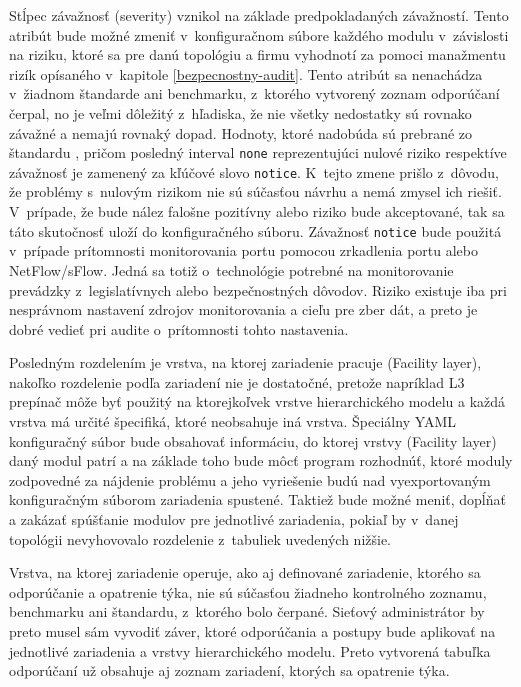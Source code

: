 Stĺpec závažnosť (severity) vznikol na základe predpokladaných závažností. Tento atribút bude možné zmeniť v~konfiguračnom súbore každého modulu v~závislosti na riziku, ktoré sa pre danú topológiu a firmu vyhodnotí za pomoci manažmentu rizík opísaného v~kapitole \ref{bezpecnostny-audit}. Tento atribút sa nenachádza v~žiadnom štandarde ani benchmarku, z~ktorého vytvorený zoznam odporúčaní čerpal, no je veľmi dôležitý z~hľadiska, že nie všetky nedostatky sú rovnako závažné a nemajú rovnaký dopad. Hodnoty, ktoré nadobúda sú prebrané zo štandardu , pričom posledný interval \texttt{none} reprezentujúci nulové riziko respektíve závažnosť je zamenený za kľúčové slovo \texttt{notice}. K~tejto zmene prišlo z~dôvodu, že problémy s~nulovým rizikom nie sú súčasťou návrhu a nemá zmysel ich riešiť. V~prípade, že bude nález falošne pozitívny alebo riziko bude akceptované, tak sa táto skutočnosť uloží do konfiguračného súboru. Závažnosť \texttt{notice} bude použitá v~prípade prítomnosti monitorovania portu pomocou zrkadlenia portu alebo NetFlow/sFlow. Jedná sa totiž o~technológie potrebné na monitorovanie prevádzky z~legislatívnych alebo bezpečnostných dôvodov. Riziko existuje iba pri nesprávnom nastavení zdrojov monitorovania a cieľu pre zber dát, a preto je dobré vedieť pri audite o~prítomnosti tohto nastavenia.
 

Posledným rozdelením je vrstva, na ktorej zariadenie pracuje (Facility layer), nakoľko rozdelenie podľa zariadení nie je dostatočné, pretože napríklad L3 prepínač môže byť použitý na ktorejkoľvek vrstve hierarchického modelu a každá vrstva má určité špecifiká, ktoré neobsahuje iná vrstva. Špeciálny YAML konfiguračný súbor bude obsahovať informáciu, do ktorej vrstvy (Facility layer) daný modul patrí a na základe toho bude môcť program rozhodnúť, ktoré moduly zodpovedné za nájdenie problému a jeho vyriešenie budú nad vyexportovaným konfiguračným súborom zariadenia spustené. Taktiež bude možné meniť, dopĺňať a zakázať spúšťanie modulov pre jednotlivé zariadenia, pokiaľ by v~danej topológii nevyhovovalo rozdelenie z~tabuliek uvedených nižšie. 

Vrstva, na ktorej zariadenie operuje, ako aj definované zariadenie, ktorého sa odporúčanie a opatrenie týka, nie sú súčasťou žiadneho kontrolného zoznamu, benchmarku ani štandardu, z~ktorého bolo čerpané. Sieťový administrátor by preto musel sám vyvodiť záver, ktoré odporúčania a postupy bude aplikovať na jednotlivé zariadenia a vrstvy hierarchického modelu. Preto vytvorená tabuľka odporúčaní už obsahuje aj zoznam zariadení, ktorých sa opatrenie týka.

